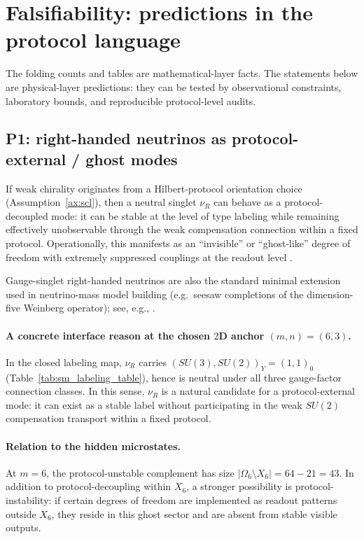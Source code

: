 
\section{Falsifiability: predictions in the protocol language}
\label{sec:falsifiability}

The folding counts and tables are mathematical-layer facts.
The statements below are physical-layer predictions: they can be tested by observational constraints, laboratory bounds, and reproducible protocol-level audits.

\subsection{P1: right-handed neutrinos as protocol-external / ghost modes}
\label{subsec:p1_rh_neutrino}

If weak chirality originates from a Hilbert-protocol orientation choice (Assumption~\ref{ax:scl}), then a neutral singlet $\nu_R$ can behave as a protocol-decoupled mode: it can be stable at the level of type labeling while remaining effectively unobservable through the weak compensation connection within a fixed protocol.
Operationally, this manifests as an ``invisible'' or ``ghost-like'' degree of freedom with extremely suppressed couplings at the readout level \cite{PDGRPP2024}.
\begin{remark}
Gauge-singlet right-handed neutrinos are also the standard minimal extension used in neutrino-mass model building (e.g.\ seesaw completions of the dimension-five Weinberg operator); see, e.g., \cite{Weinberg1979WeinbergOperator,Minkowski1977Seesaw,PDGRPP2024}.
\end{remark}
\paragraph{A concrete interface reason at the chosen $2$D anchor $(m,n)=(6,3)$.}
In the closed labeling map, $\nu_R$ carries $(SU(3),SU(2))_Y=(1,1)_0$ (Table~\ref{tab:sm_labeling_table}), hence is neutral under all three gauge-factor connection classes.
In this sense, $\nu_R$ is a natural candidate for a protocol-external mode: it can exist as a stable label without participating in the weak $SU(2)$ compensation transport within a fixed protocol.
\paragraph{Relation to the hidden microstates.}
At $m=6$, the protocol-unstable complement has size $|\Omega_6\setminus X_6|=64-21=43$.
In addition to protocol-decoupling within $X_6$, a stronger possibility is protocol-instability: if certain degrees of freedom are implemented as readout patterns outside $X_6$, they reside in this ghost sector and are absent from stable visible outputs.

